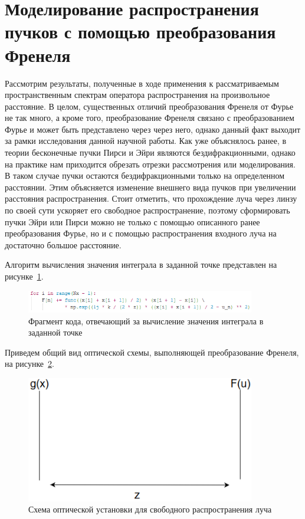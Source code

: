     \section[Моделирование распространения пучков с помощью преобразования Френеля]{\nohyphens{Моделирование распространения пучков с помощью преобразования Френеля}}{

    Рассмотрим результаты, полученные в ходе применения к рассматриваемым пространственным спектрам оператора
    распространения на произвольное расстояние. В целом, существенных отличий преобразования Френеля от Фурье не так много,
    а кроме того, преобразование Френеля связано с преобразованием Фурье и может быть представлено через через него,
    однако данный факт выходит за рамки исследования данной научной работы.
    Как уже объяснялось ранее, в теории бесконечные пучки Пирси и Эйри являются бездифракционными,
    однако на практике нам приходится обрезать отрезки рассмотрения или моделирования.
    В таком случае пучки остаются бездифракционными только на определенном расстоянии.
    Этим объясняется изменение внешнего вида пучков при увеличении расстояния распространения.
    Стоит отметить, что прохождение луча через линзу по своей сути ускоряет его свободное распространение,
    поэтому сформировать пучки Эйри или Пирси можно не только с помощью описанного ранее преобразования Фурье,
    но и с помощью распространения входного луча на достаточно большое расстояние.

    Алгоритм вычисления значения интеграла в заданной точке представлен на рисунке~\ref{listing}.
    \begin{figure}[H]
        \begin{center}
            \includegraphics[width=10cm]{plots/listing}
            \caption{Фрагмент кода, отвечающий за вычисление значения интеграла в заданной точке}
            \label{listing}
        \end{center}
    \end{figure}

    Приведем общий вид оптической схемы, выполняющей преобразование Френеля, на рисунке~\ref{fres_sys}.
    \begin{figure}[H]
        \begin{center}
            \includegraphics[width=10cm]{plots/fres_sys}
            \caption{Схема оптической установки для свободного распространения луча}
            \label{fres_sys}
        \end{center}
    \end{figure}

}
